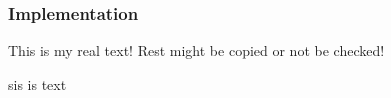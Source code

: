 \subsubsection{Implementation}\label{subsection:license-google-implementation}
This is my real text! Rest might be copied or not be checked!

sis is text
